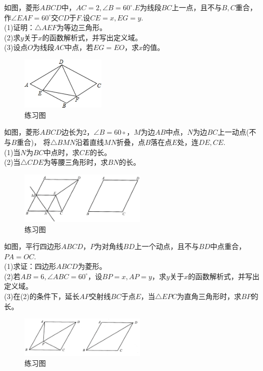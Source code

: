 \documentclass{ecnuthesis}
\begin{document}
\begin{problem}
    如图，菱形$ABCD$中，$AC=2,\angle B=60^\circ$.$E$为线段$BC$上一点，且不与$B,C$重合，作$\angle EAF=60^\circ$交$CD$于$F$.设$CE=x,EG=y$.\\
    (1)证明：$\triangle AEF$为等边三角形。 \\
    (2)求$y$关于$x$的函数解析式，并写出定义域。 \\
    (3)设点$O$为线段$AC$中点，若$EG=EO$，求$x$的值。 \\
\end{problem}
\begin{figure}[H]
\centering
\includegraphics[width=4cm]{picture/609.png}
\caption{练习图}
\end{figure}
\begin{problem}
    如图，菱形$ABCD$边长为2，$\angle B=60\circ$，$M$为边$AB$中点，$N$为边$BC$上一动点(不与$B$重合)，
    将$\triangle BMN$沿着直线$MN$折叠，点$B$落在点$E$处，连$DE,CE$. \\
    (1)当$N$为$BC$中点时，求$CE$的长。\\
    (2)当$\triangle CDE$为等腰三角形时，求$BN$的长。
\end{problem}
\begin{figure}[H]
\centering
\includegraphics[width=6cm]{picture/6124.png}
\caption{练习图}
\end{figure}
\begin{problem}
    如图，平行四边形$ABCD$，$P$为对角线$BD$上一个动点，且不与$BD$中点重合，$PA=OC$.\\
    (1)求证：四边形$ABCD$为菱形。\\
    (2)若$AB=6,\angle ABC=60^\circ$，设$BP=x,AP=y$，求$y$关于$x$的函数解析式，并写出定义域。\\
    (3)在(2)的条件下，延长$AP$交射线$BC$于点$E$，当$\triangle EPC$为直角三角形时，求$BP$的长。 \\
\end{problem}
\begin{figure}[H]
\centering
\includegraphics[width=6cm]{picture/6128.png}
\caption{练习图}
\end{figure}
\clearpage
\end{document}
